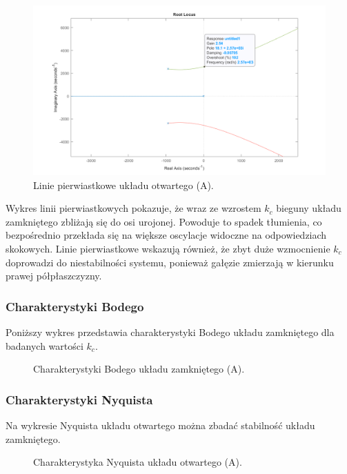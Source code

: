 \documentclass[12pt,a4paper]{article}
\begin{document}
	\begin{figure}[H]
		\centering
		\includegraphics[width=0.8\linewidth]{zdjecia/LP_ukladA.png}
		\caption{Linie pierwiastkowe układu otwartego (A).}
		\label{fig:LP_ukladA}
	\end{figure}
	
	Wykres linii pierwiastkowych pokazuje, że wraz ze wzrostem $k_c$ bieguny układu zamkniętego zbliżają się do osi urojonej. Powoduje to spadek tłumienia, co bezpośrednio przekłada się na większe oscylacje widoczne na odpowiedziach skokowych. Linie pierwiastkowe wskazują również, że zbyt duże wzmocnienie $k_c$ doprowadzi do niestabilności systemu, ponieważ gałęzie zmierzają w kierunku prawej półpłaszczyzny. 
	
	\subsubsection{Charakterystyki Bodego}
	Poniższy wykres przedstawia charakterystyki Bodego układu zamkniętego dla badanych wartości \(k_c\).
	
	\begin{figure}[H]
		\centering
		\caption{Charakterystyki Bodego układu zamkniętego (A).}
		\label{fig:bode_A}
	\end{figure}
	
	
	\subsubsection{Charakterystyki Nyquista}
	Na wykresie Nyquista układu otwartego można zbadać stabilność układu zamkniętego.
	
	\begin{figure}[H]
		\centering
		\caption{Charakterystyka Nyquista układu otwartego (A).}
		\label{fig:nyquist_A}
	\end{figure}
	
\end{document}
